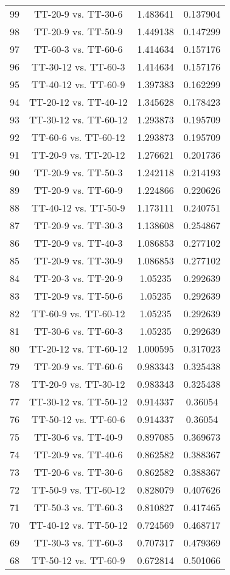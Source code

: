 \documentclass[a4paper,10pt]{article}
\begin{document}
\begin{landscape}
\begin{table}[!htp]
\begin{tabular}{cccc}
99&TT-20-9 vs. TT-30-6&1.483641&0.137904\\
98&TT-20-9 vs. TT-50-9&1.449138&0.147299\\
97&TT-60-3 vs. TT-60-6&1.414634&0.157176\\
96&TT-30-12 vs. TT-60-3&1.414634&0.157176\\
95&TT-40-12 vs. TT-60-9&1.397383&0.162299\\
94&TT-20-12 vs. TT-40-12&1.345628&0.178423\\
93&TT-30-12 vs. TT-60-12&1.293873&0.195709\\
92&TT-60-6 vs. TT-60-12&1.293873&0.195709\\
91&TT-20-9 vs. TT-20-12&1.276621&0.201736\\
90&TT-20-9 vs. TT-50-3&1.242118&0.214193\\
89&TT-20-9 vs. TT-60-9&1.224866&0.220626\\
88&TT-40-12 vs. TT-50-9&1.173111&0.240751\\
87&TT-20-9 vs. TT-30-3&1.138608&0.254867\\
86&TT-20-9 vs. TT-40-3&1.086853&0.277102\\
85&TT-20-9 vs. TT-30-9&1.086853&0.277102\\
84&TT-20-3 vs. TT-20-9&1.05235&0.292639\\
83&TT-20-9 vs. TT-50-6&1.05235&0.292639\\
82&TT-60-9 vs. TT-60-12&1.05235&0.292639\\
81&TT-30-6 vs. TT-60-3&1.05235&0.292639\\
80&TT-20-12 vs. TT-60-12&1.000595&0.317023\\
79&TT-20-9 vs. TT-60-6&0.983343&0.325438\\
78&TT-20-9 vs. TT-30-12&0.983343&0.325438\\
77&TT-30-12 vs. TT-50-12&0.914337&0.36054\\
76&TT-50-12 vs. TT-60-6&0.914337&0.36054\\
75&TT-30-6 vs. TT-40-9&0.897085&0.369673\\
74&TT-20-9 vs. TT-40-6&0.862582&0.388367\\
73&TT-20-6 vs. TT-30-6&0.862582&0.388367\\
72&TT-50-9 vs. TT-60-12&0.828079&0.407626\\
71&TT-50-3 vs. TT-60-3&0.810827&0.417465\\
70&TT-40-12 vs. TT-50-12&0.724569&0.468717\\
69&TT-30-3 vs. TT-60-3&0.707317&0.479369\\
68&TT-50-12 vs. TT-60-9&0.672814&0.501066\\

\end{tabular}
\end{table}
\end{landscape}
\end{document}
